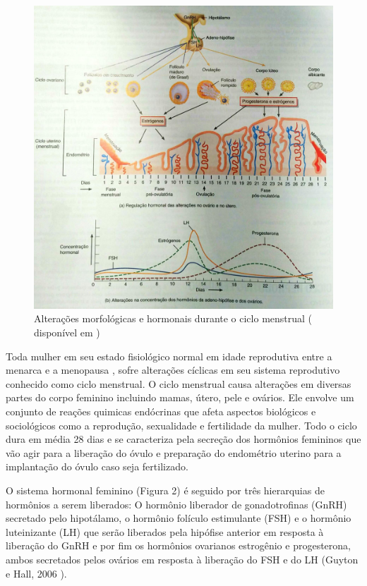 \documentclass[12pt]{article} %
\begin{document}
\begin{figure}[h!]
\includegraphics[width=16cm]{ciclo.jpg}
\caption[Alterações morfológicas e hormonais durante o ciclo menstrual]{ Alterações morfológicas e hormonais durante o ciclo menstrual ( disponível em ) } 
\end{figure} 


Toda mulher em seu estado fisiológico normal em idade reprodutiva entre a menarca e a menopausa , sofre alterações cíclicas em seu sistema reprodutivo conhecido como ciclo menstrual. O ciclo menstrual causa alterações em diversas partes do corpo feminino incluindo mamas, útero, pele e ovários. Ele envolve um conjunto de reações quimicas endócrinas que afeta aspectos biológicos e sociológicos como a reprodução, sexualidade e fertilidade da mulher. Todo o ciclo dura em média 28 dias e se caracteriza pela secreção dos hormônios femininos que vão agir para a liberação do óvulo e preparação do endométrio uterino para a implantação do óvulo caso seja fertilizado.

O sistema hormonal feminino (Figura 2) é seguido por três hierarquias de hormônios a serem liberados: O hormônio liberador de gonadotrofinas (GnRH) secretado pelo hipotálamo, o hormônio folículo estimulante (FSH) e o  hormônio luteinizante (LH) que serão liberados pela hipófise anterior em resposta à liberação do GnRH e por fim os hormônios ovarianos estrogênio e progesterona, ambos secretados pelos ovários em resposta à liberação do FSH e do LH (Guyton e Hall, 2006 ).
\end{document}
